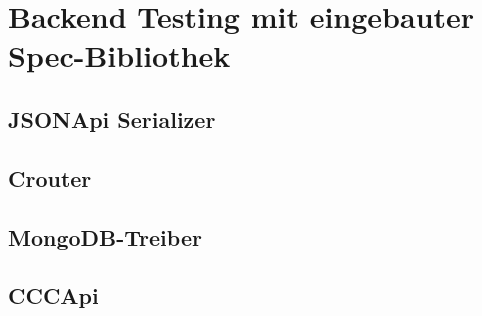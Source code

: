 \section{Backend Testing mit eingebauter Spec-Bibliothek}
\label{sec:t-backend-testing-mit-eingebauter-spec-bibliothek'}

\subsection{JSONApi Serializer}
\label{ssec:tb-jsonapi-serializer}

\subsection{Crouter}
\label{ssec:tb-crouter}

\subsection{MongoDB-Treiber}
\label{ssec:tb-mongodb-treiber}

\subsection{CCCApi}
\label{ssec:tb-cccapi}
